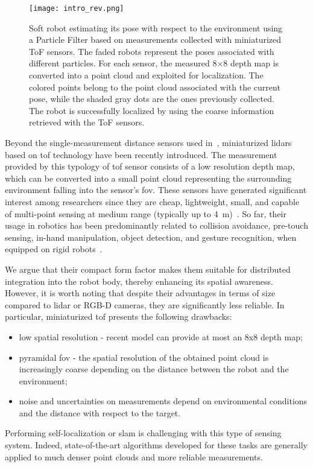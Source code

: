 \begin{figure}[t!]
	\centering
	\texttt{[image: intro\_rev.png]}
	\caption{Soft robot estimating its pose with respect to the environment using a Particle Filter based on measurements collected with miniaturized ToF sensors. The faded robots represent the poses associated with different particles. For each sensor, the measured 8×8 depth map is converted into a point cloud and exploited for localization. The colored points belong to the point cloud associated with the current pose, while the shaded gray dots are the ones previously collected. The robot is successfully localized by using the coarse information retrieved with the ToF sensors.}
	\label{fig:intro}
\end{figure}

Beyond the single-measurement distance sensors used in~\cite{karimi_2023}, miniaturized lidars based on \gls{tof} technology have been recently introduced. The measurement provided by this typology of \gls{tof} sensor consists of a low resolution depth map, which can be converted into a small point cloud representing the surrounding environment falling into the sensor's \gls{fov}.  
%
These sensors have generated significant interest among researchers since they are cheap, lightweight, small, and capable of multi-point sensing at medium range (typically up to \SI{4}{\meter})~\cite{hughes2018robotic, tsuji2021sensor,mu2024towards}.
So far, their usage in robotics has been predominantly related to collision avoidance, pre-touch sensing, in-hand manipulation, object detection, and gesture recognition, when equipped on rigid robots~\cite{ding2019proximity, ding2020collision, caroleo2024proxy, al2020towards, yang2017pre, sasaki2018robotic, koyama2018high, ruget2022pixels2pose}.

We argue that their compact form factor makes them suitable for distributed integration into the robot body, thereby enhancing its spatial awareness. However, it is worth noting that despite their advantages in terms of size compared to lidar or RGB-D cameras, they are significantly less reliable. In particular, miniaturized \gls{tof} presents the following drawbacks:
\begin{itemize}
    \item low spatial resolution - recent model can provide at most an 8x8 depth map;
    \item pyramidal \gls{fov} - the spatial resolution of the obtained point cloud is increasingly coarse depending on the distance between the robot and the environment;
    \item noise and uncertainties on measurements depend on environmental conditions and the distance with respect to the target. 
\end{itemize}
%
Performing self-localization or \gls{slam} is challenging with this type of sensing system. Indeed, state-of-the-art algorithms developed for these tasks are generally applied to much denser point clouds and more reliable measurements. 

